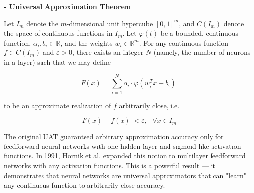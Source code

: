 \begin{theorem} \label{thm:uat}
\textbf{- Universal Approximation Theorem}

Let $I_m$ denote the $m$-dimensional unit hypercube $[0,1]^m$, and $C(I_m)$ denote the space of continuous functions in $I_m$. Let $\varphi(t)$ be a bounded, continuous function, $\alpha_i, b_i \in \mathbb{R}$, and the weights $w_i\in \mathbb{R}^m$. For any continuous function $f\in C(I_m)$ and $\varepsilon>0$, there exists an integer $N$ (namely, the number of neurons in a layer) such that we may define

\begin{equation}
    F(x) = \sum_{i=1}^N \alpha_i \cdot \varphi(w_i^T x + b_i)
\end{equation}

to be an approximate realization of $f$ arbitrarily close, i.e.

\begin{equation}
    |F(x)-f(x)| < \varepsilon, \texttt{    } \forall x\in I_m
\end{equation}

\end{theorem}

The original UAT \cite{cybenko_1989} guaranteed arbitrary approximation accuracy only for feedforward neural networks with one hidden layer and sigmoid-like activation functions. In 1991, Hornik et al. expanded this notion to multilayer feedforward networks with any activation functions. \cite{hornik_uat} This is a powerful result — it demonstrates that neural networks are universal approximators that can "learn" any continuous function to arbitrarily close accuracy. 

